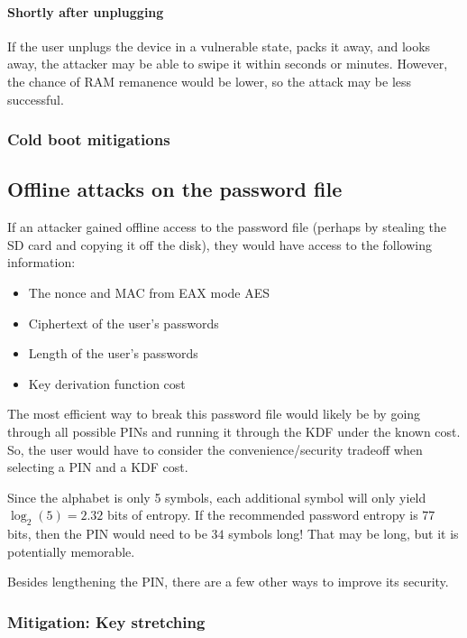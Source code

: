 \documentclass{article}
\begin{document}
\paragraph{Shortly after unplugging} If the user unplugs the device in a vulnerable state, packs it away, and looks away, the attacker may be able to swipe it within seconds or minutes. However, the chance of RAM remanence would be lower, so the attack may be less successful.

\subsubsection{Cold boot mitigations}


\subsection{Offline attacks on the password file}

If an attacker gained offline access to the password file (perhaps by stealing the SD card and copying it off the disk), they would have access to the following information:

\begin{itemize}
    \item The nonce and MAC from EAX mode AES
    \item Ciphertext of the user's passwords
    \item Length of the user's passwords
    \item Key derivation function cost
\end{itemize}

The most efficient way to break this password file would likely be by going through all possible PINs and running it through the KDF under the known cost. So, the user would have to consider the convenience/security tradeoff when selecting a PIN and a KDF cost.

Since the alphabet is only 5 symbols, each additional symbol will only yield $\log_2(5) = 2.32$ bits of entropy. If the recommended password entropy is $77$ bits, then the PIN would need to be $34$ symbols long! That may be long, but it is potentially memorable.

Besides lengthening the PIN, there are a few other ways to improve its security.

\subsubsection{Mitigation: Key stretching}
\end{document}
